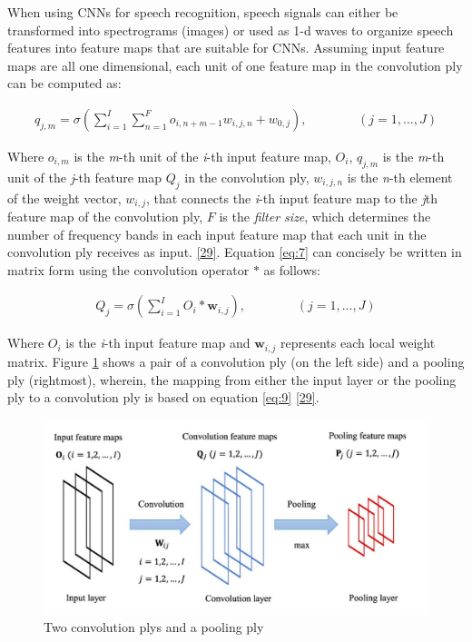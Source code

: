 \documentclass[
  a4paper,
]{article}
\begin{document}
When using CNNs for speech recognition, speech signals can either be
transformed into spectrograms (images) or used as 1-d waves to organize
speech features into feature maps that are suitable for CNNs. Assuming
input feature maps are all one dimensional, each unit of one feature map
in the convolution ply can be computed as:

\begin{align}
\label{eq:7}
q_{j,m} = \sigma(\sum_{i=1}^I\sum_{n=1}^F o_{i,n+m-1}w_{i,j,n}+w_{0,j}), \ \ \ \ \ \ \ \ \ \ \ \ \ \ \ \ \ \ (j = 1,...,J)
\end{align}

Where \(o_{i,m}\) is the \emph{m}-th unit of the \emph{i}-th input
feature map, \(O_{i}\), \(q_{j,m}\) is the \emph{m}-th unit of the
\emph{j}-th feature map \(Q_j\) in the convolution ply, \(w_{i,j,n}\) is
the \emph{n}-th element of the weight vector, \(w_{i,j}\), that connects
the \emph{i}-th input feature map to the \emph{j}th feature map of the
convolution ply, \(F\) is the \emph{filter size}, which determines the
number of frequency bands in each input feature map that each unit in
the convolution ply receives as input.
\protect\hyperlink{ref-6857341}{{[}29{]}}. Equation \ref{eq:7} can
concisely be written in matrix form using the convolution operator \(*\)
as follows:

\begin{align}
\label{eq:9}
Q_j = \sigma(\sum_{i=1}^I O_i * \textbf{w}_{i,j}), \ \ \ \ \ \ \ \ \ \ \ \ \ \ \ \ \ \ (j = 1,...,J)
\end{align}

Where \(O_i\) is the \emph{i}-th input feature map and
\(\textbf{w}_{i,j}\) represents each local weight matrix. Figure
\ref{fig:fm} shows a pair of a convolution ply (on the left side) and a
pooling ply (rightmost), wherein, the mapping from either the input
layer or the pooling ply to a convolution ply is based on equation
\ref{eq:9} \protect\hyperlink{ref-6857341}{{[}29{]}}.

\begin{figure}

{\centering \includegraphics{fm} 

}

\caption{Two convolution plys and a pooling ply}\label{fig:fm}
\end{figure}
\end{document}
